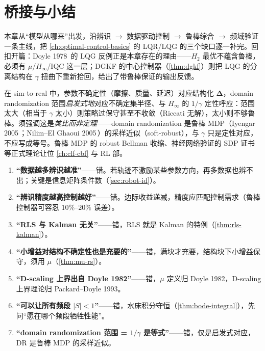 \section{桥接与小结}
\label{sec:robust-summary}

本章从“模型从哪来”出发，沿辨识 $\to$ 数据驱动控制 $\to$ 鲁棒综合 $\to$ 频域验证一条主线，把 \cref{ch:optimal-control-basics} 的 LQR/LQG 的三个缺口逐一补完。回扣开篇：Doyle 1978\,\cite{doyle1978guaranteed} 的 LQG 反例正是本章存在的理由——$H_2$ 最优不蕴含鲁棒，必须有 $\mu$/$H_\infty$/IQC 这一层；DGKF 的中心控制器（\cref{thm:dgkf}）则把 LQG 的分离结构在 $\gamma$ 扭曲下重新拾回，给出了带鲁棒保证的输出反馈。

\begin{insight}
在 sim-to-real 中，参数不确定性（摩擦、质量、延迟）对应结构化 $\boldsymbol\Delta$，domain randomization 范围\emph{启发式地}对应不确定集半径、与 $H_\infty$ 的 $1/\gamma$ 定性呼应：范围太大（相当于 $\gamma$ 太小）则策略过保守甚至不收敛（Riccati 无解），太小则不够鲁棒。须强调这是\emph{类比而非定理}——domain randomization 是鲁棒 MDP（Iyengar 2005\,\cite{iyengar2005robustdp}；Nilim--El Ghaoui 2005\,\cite{nilim2005robust}）的采样近似（soft-robust），与 $\gamma$ 只是定性对应，不应写成等号。鲁棒 MDP 的 robust Bellman 收缩、神经网络验证的 SDP 证书等正式理论让位 \cref{ch:clf-cbf} 与 RL 部。
\end{insight}

\begin{pitfall}[常见误解]
\begin{enumerate}
  \item \textbf{“数据越多辨识越准”}——错。若轨迹不激励某些参数方向，再多数据也辨不出；关键是信息矩阵条件数（\cref{sec:robot-id}）。
  \item \textbf{“辨识精度越高控制越好”}——错。边际收益递减，精度应匹配控制需求（鲁棒控制器可容忍 $10\%$--$20\%$ 误差）。
  \item \textbf{“RLS 与 Kalman 无关”}——错，RLS 就是 Kalman 的特例（\cref{thm:rls-kalman}）。
  \item \textbf{“小增益对结构不确定性也是充要的”}——错，满块才充要，结构块下小增益保守，须用 $\mu$（\cref{thm:mu-rs}）。
  \item \textbf{“D-scaling 上界出自 Doyle 1982”}——错，$\mu$ 定义归 Doyle 1982，D-scaling 上界理论归 Packard--Doyle 1993。
  \item \textbf{“可以让所有频段 $|S|<1$”}——错，水床积分守恒（\cref{thm:bode-integral}），先问“愿在哪个频段牺牲性能”。
  \item \textbf{“domain randomization 范围 = $1/\gamma$ 是等式”}——错，仅是启发式对应，DR 是鲁棒 MDP 的采样近似。
\end{enumerate}
\end{pitfall}

